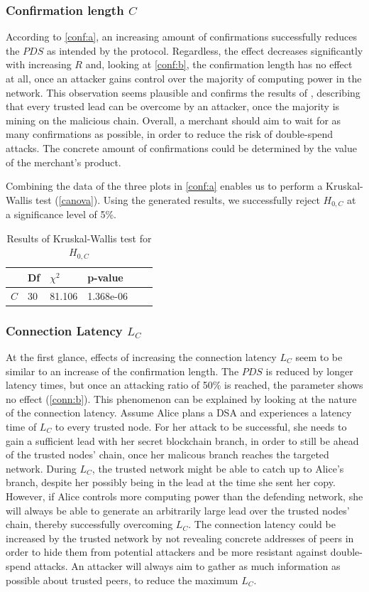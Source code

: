 \documentclass[a4paper,12pt,twoside]{report}
\begin{document}
\subsubsection{Confirmation length $C$} \label{consdisc}
According to \autoref{conf:a}, an increasing amount of confirmations successfully reduces the $PDS$ as intended by the protocol. Regardless, the effect decreases significantly with increasing $R$ and, looking at \autoref{conf:b}, the confirmation length has no effect at all, once an attacker gains control over the majority of computing power in the network. This observation seems plausible and confirms the results of \cite{nakamoto2008bitcoin,HBDSA}, describing that every trusted lead can be overcome by an attacker, once the majority is mining on the malicious chain. Overall, a merchant should aim to wait for as many confirmations as possible, in order to reduce the risk of double-spend attacks. The concrete amount of confirmations could be determined by the value of the merchant's product.

Combining the data of the three plots in \autoref{conf:a} enables us to perform a Kruskal-Wallis test (\autoref{canova}). Using the generated results, we successfully reject $H_{0,C}$ at a significance level of 5\%.
\begin{table}[hb]
\centering
\begin{tabular}{|l|l|l|l|l|l|} \hline
& Df & $\chi^{2}$ & p-value \\ \hline
$C$ & 30 & 81.106 & 1.368e-06 \\ \hline
\end{tabular}
\caption{Results of Kruskal-Wallis test for $H_{0,C}$}
\label{canova}
\end{table}
\subsubsection{Connection Latency $L_C$} \label{connlatsec}
At the first glance, effects of increasing the connection latency $L_C$ seem to be similar to an increase of the confirmation length. The $PDS$ is reduced by longer latency times, but once an attacking ratio of 50\% is reached, the parameter shows no effect (\autoref{conn:b}). This phenomenon can be explained by looking at the nature of the connection latency. Assume Alice plans a DSA and experiences a latency time of $L_C$ to every trusted node. For her attack to be successful, she needs to gain a sufficient lead with her secret blockchain branch, in order to still be ahead of the trusted nodes' chain, once her malicous branch reaches the targeted network. During $L_C$, the trusted network might be able to catch up to Alice's branch, despite her possibly being in the lead at the time she sent her copy. However, if Alice controls more computing power than the defending network, she will always be able to generate an arbitrarily large lead over the trusted nodes' chain, thereby successfully overcoming $L_C$. The connection latency could be increased by the trusted network by not revealing concrete addresses of peers in order to hide them from potential attackers and be more resistant against double-spend attacks. An attacker will always aim to gather as much information as possible about trusted peers, to reduce the maximum $L_C$.
\end{document}
